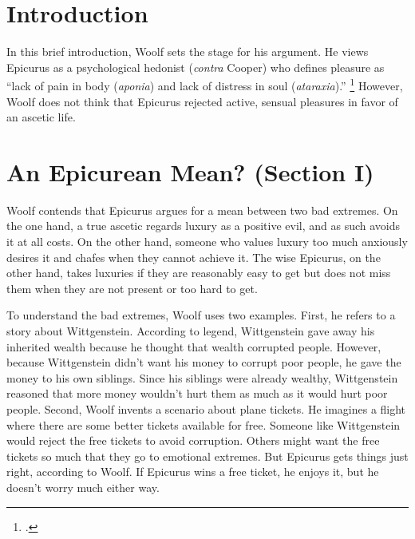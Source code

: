 \documentclass[12pt,letterpaper]{article}
\begin{document}
\raggedright


\pagestyle{notes}

\section*{Introduction}

In this brief introduction, Woolf sets the stage for his argument.
He views Epicurus as a psychological hedonist (\textit{contra} Cooper) who defines pleasure as ``lack of pain in body (\textit{aponia}) and lack of distress in soul (\textit{ataraxia}).''%
\footcite[][158]{pleasure-and-desire-woolf-2009}
However, Woolf does not think that Epicurus rejected active, sensual pleasures in favor of an ascetic life.

\section*{An Epicurean Mean? (Section I)}

Woolf contends that Epicurus argues for a mean between two bad extremes.
On the one hand, a true ascetic regards luxury as a positive evil, and as such avoids it at all costs.
On the other hand, someone who values luxury too much anxiously desires it and chafes when they cannot achieve it.
The wise Epicurus, on the other hand, takes luxuries if they are reasonably easy to get but does not miss them when they are not present or too hard to get.

To understand the bad extremes, Woolf uses two examples.
First, he refers to a story about Wittgenstein.
According to legend, Wittgenstein gave away his inherited wealth because he thought that wealth corrupted people.
However, because Wittgenstein didn't want his money to corrupt poor people, he gave the money to his own siblings.
Since his siblings were already wealthy, Wittgenstein reasoned that more money wouldn't hurt them as much as it would hurt poor people.
Second, Woolf invents a scenario about plane tickets.
He imagines a flight where there are some better tickets available for free.
Someone like Wittgenstein would reject the free tickets to avoid corruption.
Others might want the free tickets so much that they go to emotional extremes.
But Epicurus gets things just right, according to Woolf.
If Epicurus wins a free ticket, he enjoys it, but he doesn't worry much either way.
\end{document}
